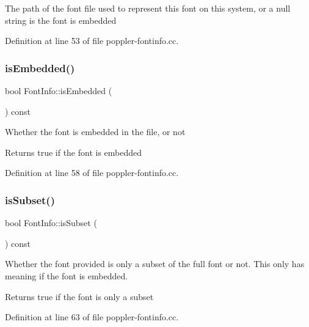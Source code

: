 The path of the font file used to represent this font on this system, or a null string is the font is embedded 

Definition at line 53 of file poppler-\/fontinfo.\+cc.

\mbox{\label{class_poppler_1_1_font_info_a6fb2d7f19b80a5433d6c5003ed316234}} 
\subsubsection{\texorpdfstring{is\+Embedded()}{isEmbedded()}}
{\footnotesize\ttfamily bool Font\+Info\+::is\+Embedded (\begin{DoxyParamCaption}{ }\end{DoxyParamCaption}) const}

Whether the font is embedded in the file, or not

\begin{DoxyReturn}{Returns}
true if the font is embedded 
\end{DoxyReturn}


Definition at line 58 of file poppler-\/fontinfo.\+cc.

\mbox{\label{class_poppler_1_1_font_info_a35849a9cbae919be0bf7fcc081a81a21}} 
\subsubsection{\texorpdfstring{is\+Subset()}{isSubset()}}
{\footnotesize\ttfamily bool Font\+Info\+::is\+Subset (\begin{DoxyParamCaption}{ }\end{DoxyParamCaption}) const}

Whether the font provided is only a subset of the full font or not. This only has meaning if the font is embedded.

\begin{DoxyReturn}{Returns}
true if the font is only a subset 
\end{DoxyReturn}


Definition at line 63 of file poppler-\/fontinfo.\+cc.

